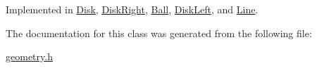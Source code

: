 Implemented in \hyperlink{classDisk_a3fcfa8ff1210e7f2258dd6db44010b09}{Disk}, \hyperlink{classDiskRight_ac88e4b980a4f5ff96ffc09122b44c78a}{Disk\-Right}, \hyperlink{classBall_a3768880c8851caa9125b967c1083043c}{Ball}, \hyperlink{classDiskLeft_a6bf1a04ca462be0549370b1e06efac6e}{Disk\-Left}, and \hyperlink{classLine_ae395e361d24c5d3213e3fdd3d60dfd0d}{Line}.



The documentation for this class was generated from the following file\-:\begin{DoxyCompactItemize}
\item 
\hyperlink{geometry_8h}{geometry.\-h}\end{DoxyCompactItemize}

